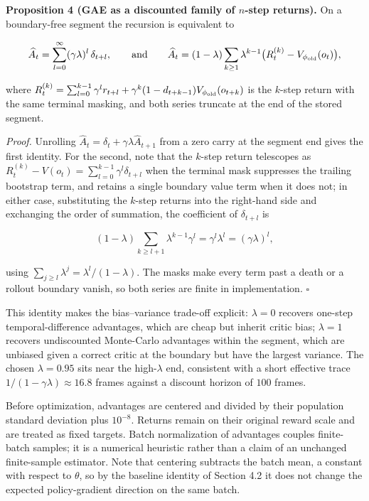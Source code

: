 \documentclass[
  11pt,
]{article}
\begin{document}
\textbf{Proposition 4 (GAE as a discounted family of \(n\)-step
returns).} On a boundary-free segment the recursion is equivalent to

\[
\widehat A_t=\sum_{l=0}^{\infty}(\gamma\lambda)^l\,\delta_{t+l},
\qquad\text{and}\qquad
\widehat A_t=(1-\lambda)\sum_{k\ge1}\lambda^{k-1}\bigl(R_t^{(k)}-V_{\phi_{\rm old}}(o_t)\bigr),
\]

where
\(R_t^{(k)}=\sum_{l=0}^{k-1}\gamma^l r_{t+l}+\gamma^k(1-d_{t+k-1})V_{\phi_{\rm old}}(o_{t+k})\)
is the \(k\)-step return with the same terminal masking, and both series
truncate at the end of the stored segment.

\emph{Proof.} Unrolling
\(\widehat A_t=\delta_t+\gamma\lambda\widehat A_{t+1}\) from a zero
carry at the segment end gives the first identity. For the second, note
that the \(k\)-step return telescopes as
\(R_t^{(k)}-V(o_t)=\sum_{l=0}^{k-1}\gamma^l\delta_{t+l}\) when the
terminal mask suppresses the trailing bootstrap term, and retains a
single boundary value term when it does not; in either case,
substituting the \(k\)-step returns into the right-hand side and
exchanging the order of summation, the coefficient of \(\delta_{t+l}\)
is

\[
(1-\lambda)\sum_{k\ge l+1}\lambda^{k-1}\gamma^l=\gamma^l\lambda^l=(\gamma\lambda)^l ,
\]

using \(\sum_{j\ge l}\lambda^{j}=\lambda^l/(1-\lambda)\). The masks make
every term past a death or a rollout boundary vanish, so both series are
finite in implementation. \(\square\)

This identity makes the bias--variance trade-off explicit: \(\lambda=0\)
recovers one-step temporal-difference advantages, which are cheap but
inherit critic bias; \(\lambda=1\) recovers undiscounted Monte-Carlo
advantages within the segment, which are unbiased given a correct critic
at the boundary but have the largest variance. The chosen
\(\lambda=0.95\) sits near the high-\(\lambda\) end, consistent with a
short effective trace \(1/(1-\gamma\lambda)\approx16.8\) frames against
a discount horizon of \(100\) frames.

Before optimization, advantages are centered and divided by their
population standard deviation plus \(10^{-8}\). Returns remain on their
original reward scale and are treated as fixed targets. Batch
normalization of advantages couples finite-batch samples; it is a
numerical heuristic rather than a claim of an unchanged finite-sample
estimator. Note that centering subtracts the batch mean, a constant with
respect to \(\theta\), so by the baseline identity of Section 4.2 it
does not change the expected policy-gradient direction on the same
batch.
\end{document}
